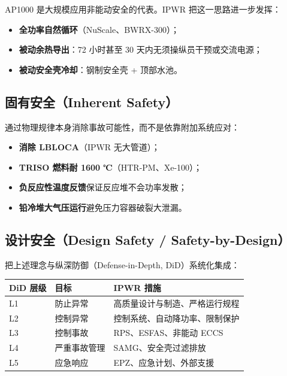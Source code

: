 \documentclass[
  UTF8,
  scheme=plain,
  fontsize=10pt,
  openany
]{ctexbook}
\begin{document}
AP1000 是大规模应用非能动安全的代表。IPWR 把这一思路进一步发挥：

\begin{itemize}
\tightlist
\item
  \textbf{全功率自然循环}（NuScale、BWRX-300）；
\item
  \textbf{被动余热导出}：72 小时甚至 30 天内无须操纵员干预或交流电源；
\item
  \textbf{被动安全壳冷却}：钢制安全壳 + 顶部水池。
\end{itemize}

\subsection{固有安全（Inherent
Safety）}\label{ux56faux6709ux5b89ux5168inherent-safety}

通过物理规律本身消除事故可能性，而不是依靠附加系统应对：

\begin{itemize}
\tightlist
\item
  \textbf{消除 LBLOCA}（IPWR 无大管道）；
\item
  \textbf{TRISO 燃料耐 1600 ℃}（HTR-PM、Xe-100）；
\item
  \textbf{负反应性温度反馈}保证反应堆不会功率发散；
\item
  \textbf{铅冷堆大气压运行}避免压力容器破裂大泄漏。
\end{itemize}

\subsection{设计安全（Design Safety /
Safety-by-Design）}\label{ux8bbeux8ba1ux5b89ux5168design-safety-safety-by-design}

把上述理念与纵深防御（Defense-in-Depth, DiD）系统化集成：

{\def\LTcaptype{none} %
\begin{longtable}[]{@{}lll@{}}
\toprule\noalign{}
DiD 层级 & 目标 & IPWR 措施 \\
\midrule\noalign{}
\endhead
\bottomrule\noalign{}
\endlastfoot
L1 & 防止异常 & 高质量设计与制造、严格运行规程 \\
L2 & 控制异常 & 控制系统、自动降功率、限制保护 \\
L3 & 控制事故 & RPS、ESFAS、非能动 ECCS \\
L4 & 严重事故管理 & SAMG、安全壳过滤排放 \\
L5 & 应急响应 & EPZ、应急计划、外部支援 \\
\end{longtable}
}
\end{document}
